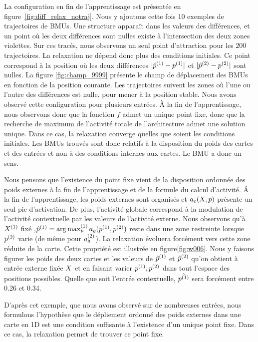 \documentclass[../main]{subfiles}
\begin{document}
La configuration en fin de l'apprentissage est présentée en figure~\ref{fig:diff_relax_notraj}. Nous y ajoutons cette fois 10 exemples de trajectoires de BMUs.
Une structure apparaît dans les valeurs des différences, et un point où les deux différences sont nulles existe à l'intersection des deux zones violettes.
Sur ces tracés, nous observons un seul point d'attraction pour les 200 trajectoires. La relaxation ne dépend donc plus des conditions initiales.
Ce point correspond à la position où les deux différences $\lvert \hat{p}^{({1})} - p^{({1})} \rvert$ et $\lvert \hat{p}^{({2})} - p^{({2})}\rvert$ sont nulles.
La figure \ref{fig:champ_9999} présente le champ de déplacement des BMUs en fonction de la position courante. Les trajectoires suivent les zones où l'une ou l'autre des différences est nulle, pour mener à la position stable. 
Nous avons observé cette configuration pour plusieurs entrées.
\`A la fin de l'apprentissage, nous observons donc que la fonction $f$ admet un unique point fixe, donc que la recherche de maximum de l'activité totale de l'architecture admet une solution unique. Dans ce cas, la relaxation converge quelles que soient les conditions initiales. Les BMUs trouvés sont donc relatifs à la disposition du poids des cartes et des entrées et non à des conditions internes aux cartes. Le BMU a donc un sens. 

Nous pensons que l'existence du point fixe vient de la disposition ordonnée des poids externes à la fin de l'apprentissage et de la formule du calcul d'activité.
\'A la fin de l'apprentissage, les poids externes sont organisés et $a_e(X,p)$ présente un seul pic d'activation.
De plus, l'activité globale correspond à la modulation de l'activité contextuelle par les valeurs de l'activité externe. 
Nous observons qu'à $X^{({1})}$ fixé ,$\hat{p}^{({1})} = \operatorname*{arg\,max}_p^{({1})} a_g(p^{({1})}, p^{({2})})$ reste dans une zone restreinte lorsque $p^{({2})}$ varie (de même pour $a_g^{({2})}$). 
La relaxation évoluera forcément vers cette zone réduite de la carte.
Cette propriété est illustrée en figure\ref{fig:w006}.
Nous y faisons figurer les poids des deux cartes et les valeurs de $\hat{p}^{({1})}$ et $\hat{p}^{({2})}$ qu'on obtient à entrée externe fixée $X$ et en faisant varier $p^{({1})}, p^{({2})}$ dans tout l'espace des positions possibles. Quelle que soit l'entrée contextuelle, $\hat{p^{({1})}}$ sera forcément entre 0.26 et 0.34.

D'après cet exemple, que nous avons observé sur de nombreuses entrées, nous formulons l'hypothèse que le dépliement ordonné des poids externes dans une carte en 1D est une condition suffisante à l'existence d'un unique point fixe. 
Dans ce cas, la relaxation permet de trouver ce point fixe.
\end{document}
